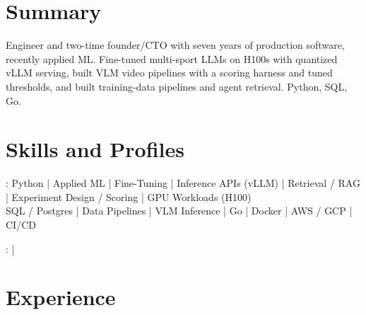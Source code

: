 \documentclass[print]{jack-resume}
\begin{document}
\pagecolor{darkmodeBackground}


\begin{minipage}[t][1cm][t]{.03\textwidth}
    \hfill
\end{minipage}

\section{Summary}
Engineer and two-time founder/CTO with seven years of production software, recently applied ML. Fine-tuned multi-sport LLMs on H100s with quantized vLLM serving, built VLM video pipelines with a scoring harness and tuned thresholds, and built training-data pipelines and agent retrieval. Python, SQL, Go.
\sectionsep

\section{Skills and Profiles}
:
Python \hfill | \hfill
Applied ML \hfill | \hfill
Fine-Tuning \hfill | \hfill
Inference APIs (vLLM) \hfill | \hfill
Retrieval / RAG \hfill | \hfill
Experiment Design / Scoring \hfill | \hfill
GPU Workloads (H100) \\
\hspace{1.0cm} SQL / Postgres \hfill | \hfill
Data Pipelines \hfill | \hfill
VLM Inference \hfill | \hfill
Go \hfill | \hfill
Docker \hfill | \hfill
AWS / GCP \hfill | \hfill
CI/CD \\

\raggedright{
    :
      \href{https://www.linkedin.com/in/jack-sturtevant/}{ \ExternalLink} |
     \href{https://github.com/jacksturt}{ \ExternalLink}}

\section{Experience}
\end{document}
